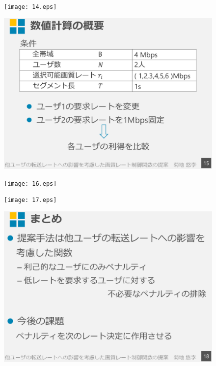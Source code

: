 \documentclass[a4paper,12pt,report]{jsbook}
\begin{document}
\begin{figure}[tb]
  \centering
  \texttt{[image: 14.eps]}
\end{figure}

\begin{figure}[tp]
  \centering
  \includegraphics[scale=0.45]{15.eps}
\end{figure}

\begin{figure}[tb]
  \centering
  \texttt{[image: 16.eps]}
\end{figure}

\begin{figure}[tp]
  \centering
  \texttt{[image: 17.eps]}
\end{figure}

\begin{figure}[tb]
  \centering
  \includegraphics[scale=0.45]{18.eps}
\end{figure}
\end{document}
